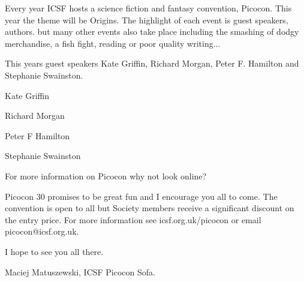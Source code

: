 
Every year ICSF hosts a science fiction and fantasy
convention, Picocon.
This year the theme will be Origins.
The highlight of each event is guest speakers, authors.
but many other events also take place including the
smashing of dodgy merchandise, a fish fight,
reading or poor quality writing...

This years guest speakers Kate Griffin, Richard Morgan,
Peter F. Hamilton and Stephanie Swainston.

\begin{article}{Kate Griffin}{}
	
\end{article}
\begin{article}{Richard Morgan}{}
	
\end{article}
\begin{article}{Peter F Hamilton}{}
	
\end{article}
\begin{article}{Stephanie Swainston}{}
	
\end{article}

For more information on Picocon why not look online?

Picocon 30 promises to be great fun and I encourage you all to come.
The convention is open to all but Society members receive a significant
discount on the entry price.
For more information see icsf.org.uk/picocon or email picocon@icsf.org.uk.

I hope to see you all there.

Maciej Matuszewski,
ICSF Picocon Sofa.
